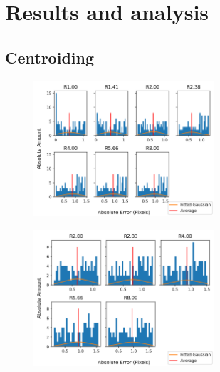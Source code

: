 \documentclass[aps,pra,a4paper,nofootinbib,onecolumn,tightenlines,longbibliography,12pt,amsfonts,amssymb,amsmath,floatfix]{revtex4-2} %
\begin{document}
    
    

\section{Results and analysis} %
\label{sec:Results}

  \subsection{Centroiding} %
  \label{sub:Centroiding_results}
  
  \begin{figure}[H]
    \begin{center}
      \includegraphics[width=0.6\textwidth]{project_pics/distro_centriod_3.png}
    \end{center}
    \caption{}
    \label{fig:box_3}
  \end{figure}

  \begin{figure}[H]
    \begin{center}
      \includegraphics[width=0.6\textwidth]{project_pics/noise_cen_scatter_3.png}
    \end{center}
    \caption{}
    \label{fig:box_3_noise}
  \end{figure}
  
\end{document}
